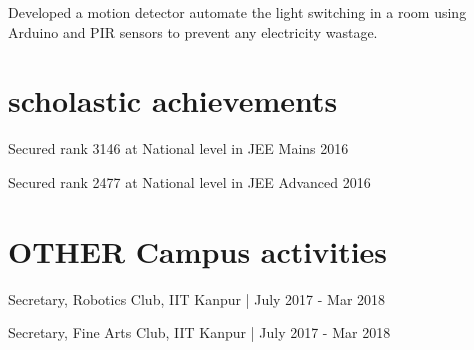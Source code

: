 \documentclass[]{deedy-resume-openfont}
\begin{document}
\begin{minipage}[t]{0.66\textwidth}
\begin{tightemize}
\item Developed a motion detector automate the light switching in a room using Arduino and PIR sensors to prevent any electricity wastage.
\end{tightemize}
\sectionsep


\section{scholastic achievements} 
\vspace{\topsep} %
\begin{tightemize}
\item Secured rank 3146 at National level in JEE Mains 2016 \\ 
\item Secured rank 2477 at National level in JEE Advanced 2016
\end{tightemize}
\sectionsep


\section{OTHER Campus activities}
\vspace{\topsep} %
\begin{tightemize}
\item Secretary, Robotics Club, IIT Kanpur | July 2017 - Mar 2018 \\
\item Secretary, Fine Arts Club, IIT Kanpur | July 2017 - Mar 2018 \\
\end{tightemize}


\end{minipage} 
\end{document}

